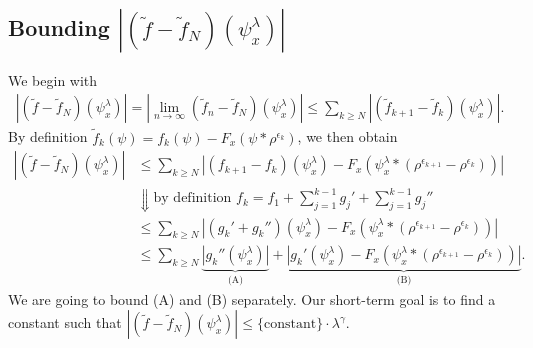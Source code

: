 \subsection*{Bounding $|(\tilde f - \tilde f_N) (\psi^\lambda_x)|$} 

We begin with
\begin{align*}
    |(\tilde f - \tilde f_N) (\psi^\lambda_x)| = |\lim_{n \to \infty} (\tilde f_n - \tilde f_N) (\psi^\lambda_x)| \leq \sum_{k \geq N}|(\tilde f_{k+1} - \tilde f_k)(\psi^\lambda_x)|.
\end{align*}
By definition $\tilde f_k(\psi) = f_k(\psi) - F_x(\psi * \rho^{\epsilon_k})$, we then obtain 
\begin{align*}
    |(\tilde f - \tilde f_N) (\psi^\lambda_x)| 
    &\leq \sum_{k \geq N} |(f_{k+1} - f_k)(\psi^\lambda_x) - F_x(\psi^\lambda_x * (\rho^{\epsilon_{k+1}} - \rho^{\epsilon_k}))| \\
    &\Downarrow \text{by definition $f_k = f_1 + \sum^{k-1}_{j=1} g_j' + \sum^{k-1}_{j=1}g_j''$}\\
    &\leq
    \sum_{k \geq N} |(g_k' + g_k'')(\psi^{\lambda}_x) - F_x(\psi^\lambda_x * (\rho^{\epsilon_{k+1}} - \rho^{\epsilon_k}))| \\
    &\leq \sum_{k \geq N} \underbrace{|g_k''(\psi^{\lambda}_x)|}_{\text{(A)}} + \underbrace{ |g_k'(\psi^\lambda_x) - F_x(\psi^\lambda_x * (\rho^{\epsilon_{k+1}} - \rho^{\epsilon_k}))|}_{\text{(B)}}.
\end{align*}
We are going to bound (A) and (B) separately. Our short-term goal is to find a constant such that $|(\tilde f - \tilde f_N) (\psi^\lambda_x)| \leq \{\mathrm{constant}\} \cdot \lambda^{\gamma}$. 

\vspace{0.5em}

